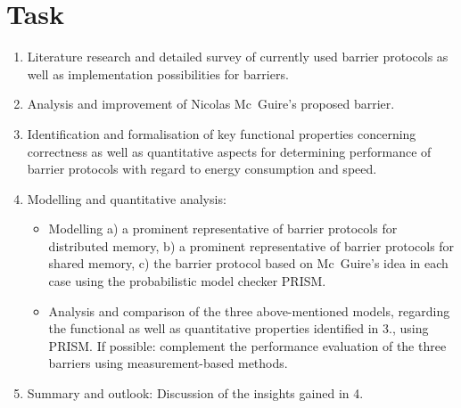 \documentclass[a4paper, 10pt]{article}
\begin{document}
\section*{Task}
\label{sec:task}
\begin{enumerate}
	\item Literature research and detailed survey of currently used barrier protocols as well as implementation possibilities for barriers.
	\item Analysis and improvement of Nicolas Mc~Guire's proposed barrier.
	\item Identification and formalisation of key functional properties concerning correctness as well as quantitative aspects for determining performance of barrier protocols with regard to energy consumption and speed.
		\item Modelling and quantitative analysis:
			\begin{itemize}
				\item Modelling a) a prominent representative of barrier protocols for distributed memory, b) a prominent representative of barrier protocols for shared memory, c) the barrier protocol based on Mc~Guire's idea in each case using the probabilistic model checker PRISM.
				\item Analysis and comparison of the three above-mentioned models, regarding the functional as well as quantitative properties identified in 3., using PRISM. If possible: complement the performance evaluation of the three barriers using measurement-based methods.
			\end{itemize}
		\item Summary and outlook: Discussion of the insights gained in 4.
\end{enumerate}

\pagebreak
\newpage \thispagestyle{empty} \mbox{}
\pagebreak

\thispagestyle{empty}

\end{document}
